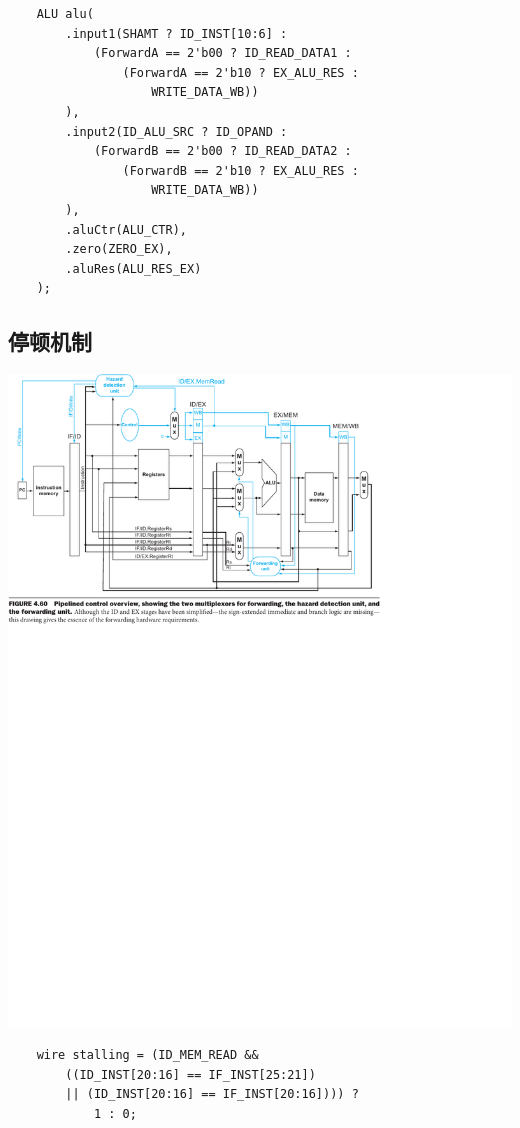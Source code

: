 \documentclass[a4paper,UTF8]{ctexart}
\begin{document}
\begin{verbatim}
    ALU alu(
        .input1(SHAMT ? ID_INST[10:6] : 
            (ForwardA == 2'b00 ? ID_READ_DATA1 :
                (ForwardA == 2'b10 ? EX_ALU_RES : 
                    WRITE_DATA_WB))
        ),
        .input2(ID_ALU_SRC ? ID_OPAND : 
            (ForwardB == 2'b00 ? ID_READ_DATA2 :
                (ForwardB == 2'b10 ? EX_ALU_RES :
                    WRITE_DATA_WB))
        ),
        .aluCtr(ALU_CTR),
        .zero(ZERO_EX),
        .aluRes(ALU_RES_EX)
    );
\end{verbatim}

\subsection{停顿机制}

\includegraphics[width=\textwidth]{stall.pdf}

\begin{verbatim}
    wire stalling = (ID_MEM_READ && 
        ((ID_INST[20:16] == IF_INST[25:21]) 
        || (ID_INST[20:16] == IF_INST[20:16]))) ? 
            1 : 0;
\end{verbatim}
\end{document}
